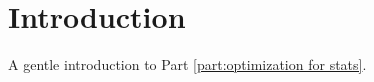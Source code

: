 \chapter{Introduction}
\label{Ch:StatisticalOptimizationIntro}


A gentle introduction to Part \ref{part:optimization for stats}.